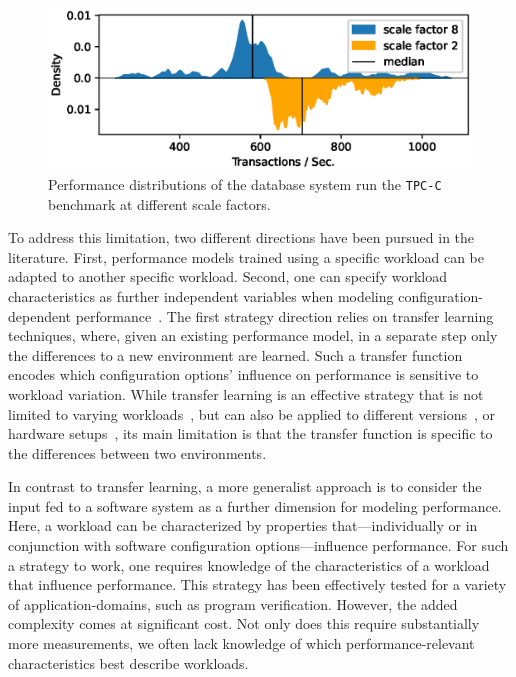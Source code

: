 \begin{figure}
	\centering
	\includegraphics[width=0.8\linewidth]{images/h2_motivation.eps}
	\caption{Performance distributions of the database system \htwo run the \texttt{TPC-C} benchmark at different scale factors.}
	\label{fig:h2_intro}
\end{figure}

To address this limitation, two different directions have been pursued in the literature. First, performance models trained using a specific workload can be adapted to another specific workload. Second,  one can specify workload characteristics as further independent variables when modeling configuration-dependent performance~\cite{koc_satune_2021}.
The first strategy direction relies on transfer learning techniques, where, given an existing performance model, in a separate step only the differences to a new environment are learned. Such a transfer function encodes which configuration options’ influence on performance is sensitive to workload variation. While transfer learning is an effective strategy that is not limited to varying workloads~\cite{jamshidi_learning_2018}, but can also be applied to different versions~\cite{jamishidi_transfer_2017,jamshidi_transfer_gp_2017,martin_transfer_2021}, or hardware setups~\cite{ding_bayesian_2020}, its main limitation is that the transfer function is specific to the differences between two environments.



In contrast to transfer learning, a more generalist approach is to consider the input fed to a software system as a further dimension for modeling performance. Here, a workload can be characterized by properties that---individually or in conjunction with software configuration options---influence performance. For such a strategy to work, one requires knowledge of the characteristics of a workload that influence performance. This strategy has been effectively tested for a  variety of application-domains, such as program verification. However, the added complexity comes at significant cost. 
Not only does this require substantially more measurements, we often lack knowledge of which performance-relevant characteristics best describe workloads.


